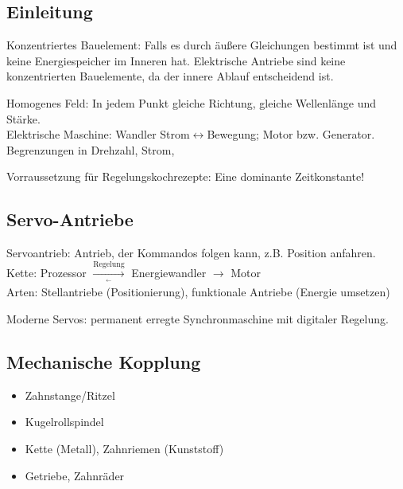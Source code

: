 \documentclass[fs, footer]{latex4ei}
\begin{document}
\begin{multicols*}{4}

\section{Einleitung}

Konzentriertes Bauelement: Falls es durch äußere Gleichungen bestimmt ist und keine Energiespeicher im Inneren hat.
Elektrische Antriebe sind keine konzentrierten Bauelemente, da der innere Ablauf entscheidend ist.

Homogenes Feld: In jedem Punkt gleiche Richtung, gleiche Wellenlänge und Stärke. \\
Elektrische Maschine: Wandler Strom$\leftrightarrow$Bewegung; Motor bzw. Generator.\\

Begrenzungen in Drehzahl, Strom, 

Vorraussetzung für Regelungskochrezepte: Eine dominante Zeitkonstante! 



	\subsection{Servo-Antriebe}
	Servoantrieb: Antrieb, der Kommandos folgen kann, z.B. Position anfahren.\\
	Kette: Prozessor $\xrightarrow[{}^{\longleftarrow}]{\text{Regelung}}$ Energiewandler $\longrightarrow$ Motor\\

	Arten: Stellantriebe (Positionierung), funktionale Antriebe (Energie umsetzen)

	Moderne Servos: permanent erregte Synchronmaschine mit digitaler Regelung.



	\subsection{Mechanische Kopplung}
	\begin{itemize}
		\item Zahnstange/Ritzel
		\item Kugelrollspindel
		\item Kette (Metall), Zahnriemen (Kunststoff)
		\item Getriebe, Zahnräder
	\end{itemize}




\end{multicols*}

\end{document}
